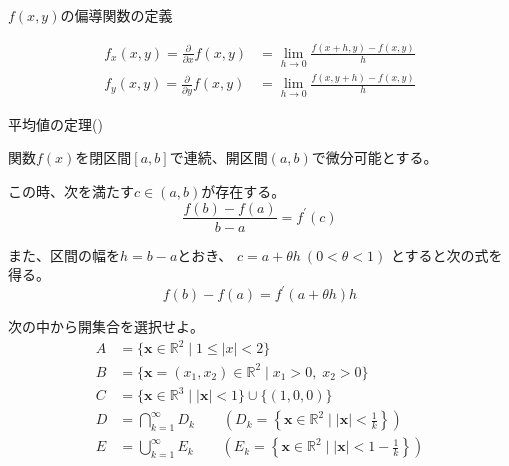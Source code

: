 \documentclass[12pt,b5paper]{ltjsarticle}
\begin{document}
\dotfill

$f(x,y)$の偏導関数の定義

\begin{align}
 f_x(x,y) = \frac{\partial}{\partial x}f(x,y)
&=\lim_{h\rightarrow 0} \frac{f(x+h,y)-f(x,y)}{h}\\
 f_y(x,y) = \frac{\partial}{\partial y}f(x,y)
&=\lim_{h\rightarrow 0} \frac{f(x,y+h)-f(x,y)}{h}
\end{align}

\dotfill

平均値の定理()

関数$f(x)$を閉区間$[a,b]$で連続、開区間$(a,b)$で微分可能とする。

この時、次を満たす$c\in (a,b)$が存在する。
\begin{equation}
 \frac{f(b)-f(a)}{b-a} = f^{\prime}(c)
\end{equation}

また、区間の幅を$h=b-a$とおき、
$c=a+\theta h \ (0<\theta<1)$
とすると次の式を得る。
\begin{equation}
 f(b)-f(a) = f^{\prime}(a+\theta h)h
\end{equation}

\hrulefill

次の中から開集合を選択せよ。
\begin{align}
 A &= \{\bm{x}\in\mathbb{R}^2 \mid 1\leq \lvert x \rvert <2  \}\\
 B &= \{\bm{x}=(x_1, x_2)\in\mathbb{R}^2 \mid x_1>0, \; x_2>0 \}\\
 C &= \{\bm{x}\in\mathbb{R}^3 \mid \lvert \bm{x} \rvert<1 \} \cup \{(1,0,0)\}\\
 D &= \bigcap_{k=1}^{\infty} D_k \qquad \left(
   D_k= \left\{\bm{x}\in\mathbb{R}^2 \mid
   \lvert \bm{x} \rvert < \frac{1}{k} \right\}\right)\\
 E &= \bigcup_{k=1}^{\infty} E_k \qquad \left(
   E_k= \left\{\bm{x}\in\mathbb{R}^2 \mid
   \lvert \bm{x} \rvert < 1- \frac{1}{k} \right\}\right)
\end{align}
\end{document}
